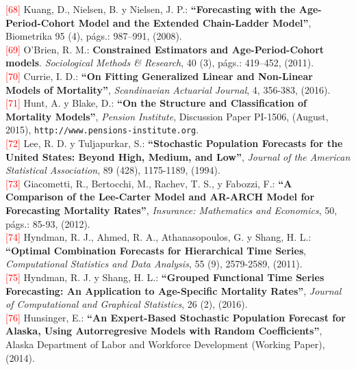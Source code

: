 \noindent \textcolor{red}{[68]} Kuang, D., Nielsen, B. y Nielsen, J. P.: \textbf{``Forecasting with the Age-Period-Cohort Model and the Extended Chain-Ladder Model''}, Biometrika 95 (4), págs.: 987–991, (2008).\\

\noindent \textcolor{red}{[69]} O’Brien, R. M.: \textbf{Constrained Estimators and Age-Period-Cohort models}. \textit{Sociological Methods \& Research}, 40 (3), págs.: 419–452, (2011).\\

\noindent \textcolor{red}{[70]} Currie, I. D.: \textbf{``On Fitting Generalized Linear and Non-Linear Models of Mortality''}, \textit{Scandinavian Actuarial Journal}, 4, 356-383, (2016).\\

\noindent \textcolor{red}{[71]} Hunt, A. y Blake, D.: \textbf{``On the Structure and Classification of Mortality Models''}, \textit{Pension Institute}, Discussion Paper PI-1506, (August, 2015), {\texttt{\small{http://www.pensions-institute.org}}}.\\

\noindent \textcolor{red}{[72]} Lee, R. D. y Tuljapurkar, S.: \textbf{``Stochastic Population Forecasts for the United States: Beyond High, Medium, and Low''}, \textit{Journal of the American Statistical Association}, 89 (428), 1175-1189, (1994).\\

\noindent \textcolor{red}{[73]} Giacometti, R., Bertocchi, M., Rachev, T. S., y Fabozzi, F.: \textbf{``A Comparison of the Lee-Carter Model and AR-ARCH Model for Forecasting Mortality Rates''}, \textit{Insurance: Mathematics and Economics}, 50, págs.: 85-93, (2012).\\

\noindent \textcolor{red}{[74]} Hyndman, R. J., Ahmed, R. A., Athanasopoulos, G. y Shang, H. L.: \textbf{``Optimal Combination Forecasts for Hierarchical Time Series}, \textit{Computational Statistics and Data Analysis}, 55 (9), 2579-2589, (2011).\\

\noindent \textcolor{red}{[75]} Hyndman, R. J. y Shang, H. L.: \textbf{``Grouped Functional Time Series Forecasting: An Application to Age-Specific Mortality Rates''}, \textit{Journal of Computational and Graphical Statistics}, 26 (2), (2016).\\

\noindent \textcolor{red}{[76]} Hunsinger, E.: \textbf{``An Expert-Based Stochastic Population Forecast for Alaska, Using Autorregresive Models with Random Coefficients''}, Alaska Department of Labor and Workforce Development (Working Paper), (2014).\\ 

